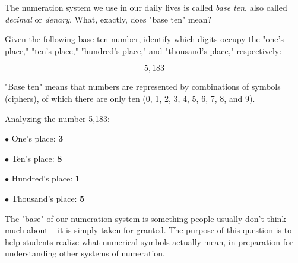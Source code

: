 

The numeration system we use in our daily lives is called {\it base ten}, also called {\it decimal} or {\it denary}.  What, exactly, does "base ten" mean?

Given the following base-ten number, identify which digits occupy the "one's place," "ten's place," "hundred's place," and "thousand's place," respectively:

$$5,183$$







"Base ten" means that numbers are represented by combinations of symbols (ciphers), of which there are only ten (0, 1, 2, 3, 4, 5, 6, 7, 8, and 9).

\vskip 10pt

Analyzing the number 5,183:

\medskip
\item{$\bullet$} One's place: {\bf 3}
\item{$\bullet$} Ten's place: {\bf 8}
\item{$\bullet$} Hundred's place: {\bf 1}
\item{$\bullet$} Thousand's place: {\bf 5}
\medskip







The "base" of our numeration system is something people usually don't think much about -- it is simply taken for granted.  The purpose of this question is to help students realize what numerical symbols actually mean, in preparation for understanding other systems of numeration.




